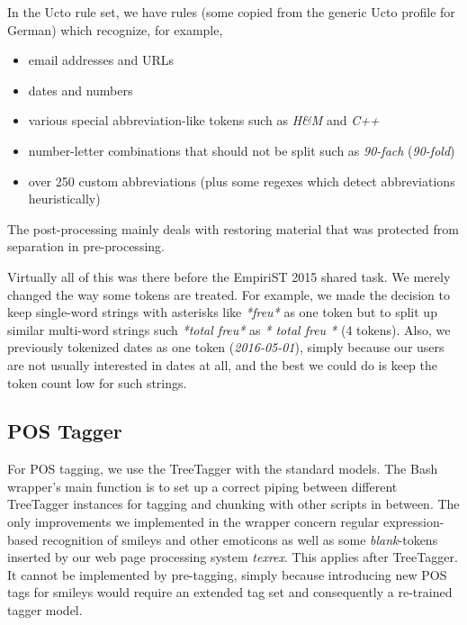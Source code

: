 \documentclass[11pt]{article}
\newcommand{\Lf}{
  \setlength{\itemsep}{1pt}
  \setlength{\parskip}{0pt}
  \setlength{\parsep}{0pt}
}
\begin{document}
In the Ucto rule set, we have rules (some copied from the generic Ucto profile for German) which recognize, for example,

\begin{itemize}\Lf
  \item email addresses and URLs
  \item dates and numbers
  \item various special abbreviation-like tokens such as \textit{H\&M} and \textit{C++}
  \item number-letter combinations that should not be split such as \textit{90-fach} (\textit{90-fold})
  \item over 250 custom abbreviations (plus some regexes which detect abbreviations heuristically)
\end{itemize}

The post-processing mainly deals with restoring material that was protected from separation in pre-processing.

Virtually all of this was there before the EmpiriST 2015 shared task.
We merely changed the way some tokens are treated.
For example, we made the decision to keep single-word strings with asterisks like \textit{*freu*} as one token but to split up similar multi-word strings such \textit{*total freu*} as \textit{* total freu *} (4 tokens).
Also, we previously tokenized dates as one token (\textit{2016-05-01}), simply because our users are not usually interested in dates at all, and the best we could do is keep the token count low for such strings.

\subsection{POS Tagger}
\label{sec:postagger}

For POS tagging, we use the TreeTagger \cite{Schmid1994b} with the standard models.
The Bash wrapper's main function is to set up a correct piping between different TreeTagger instances for tagging and chunking with other scripts in between.
The only improvements we implemented in the wrapper concern regular expression-based recognition of smileys and other emoticons as well as some \textit{blank}-tokens inserted by our web page processing system \textit{texrex}.
This applies after TreeTagger.
It cannot be implemented by pre-tagging, simply because introducing new POS tags for smileys would require an extended tag set and consequently a re-trained tagger model.
\end{document}
